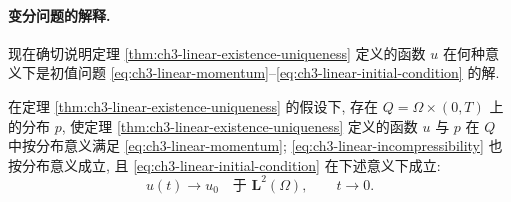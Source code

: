 \paragraph{变分问题的解释.}
现在确切说明定理 \ref{thm:ch3-linear-existence-uniqueness} 定义的函数 $u$ 在何种意义下是初值问题 \eqref{eq:ch3-linear-momentum}--\eqref{eq:ch3-linear-initial-condition} 的解.

\begin{Proposition}
\label{prop:ch3-linear-pressure-distribution}
在定理 \ref{thm:ch3-linear-existence-uniqueness} 的假设下, 存在 $Q=\Omega\times(0,T)$ 上的分布 $p$, 使定理 \ref{thm:ch3-linear-existence-uniqueness} 定义的函数 $u$ 与 $p$ 在 $Q$ 中按分布意义满足 \eqref{eq:ch3-linear-momentum}; \eqref{eq:ch3-linear-incompressibility} 也按分布意义成立, 且 \eqref{eq:ch3-linear-initial-condition} 在下述意义下成立:
\begin{equation}
u(t)\longrightarrow u_0\quad\text{于 }\mathbf L^2(\Omega),
\qquad t\to0.
\label{eq:ch3-linear-initial-l2-convergence}
\end{equation}
\end{Proposition}

